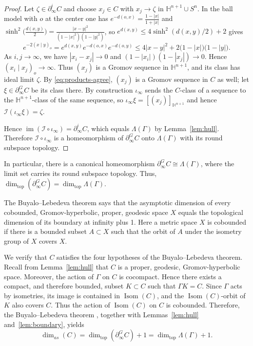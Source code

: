 \documentclass[12pt,oneside,a4paper]{article}
\theoremstyle{mytheorem}
\theoremstyle{remark}
\theoremstyle{definition}
\begin{document}
\begin{proof}
Let \(\zeta\in\partial_\infty^{i}C\) and choose
\(x_j\in C\) with \(x_j\to\zeta\) in \(\mathbb H^{n+1}\cup S^n\).  In the
ball model with \(o\) at the center one has
\(e^{-d(o,x)}=\frac{1-|x|}{1+|x|}\) and
\(\sinh^2\!\bigl(\tfrac{d(x,y)}{2}\bigr)
=\frac{|x-y|^2}{(1-|x|^2)(1-|y|^2)}\), so \(e^{d(x,y)}\leq4\sinh^2(d(x,y)/2)+2\)
gives
\[
 e^{-2(x\mid y)_o}
 =e^{d(x,y)}e^{-d(o,x)}e^{-d(o,y)}
 \leq 4|x-y|^{2}+2\bigl(1-|x|\bigr)\bigl(1-|y|\bigr).
\]
As \(i,j\to\infty\), we have \(|x_i-x_j|\to0\) and
\((1-|x_i|)(1-|x_j|)\to0\). Hence
\((x_i\mid x_j)_o\to\infty\). Thus \((x_j)\) is a Gromov sequence in
\(\mathbb H^{n+1}\), and its class has ideal limit \(\zeta\). By
\eqref{eq:products-agree}, \((x_j)\) is a Gromov sequence in \(C\) as well;
let \(\xi\in\partial_\infty^{G}C\) be its class there.  By construction
\(\iota_\infty\) sends the \(C\)-class of a sequence to the
\(\mathbb H^{n+1}\)-class of the same sequence, so
\(\iota_\infty\xi=[(x_j)]_{\mathbb H^{n+1}}\) and hence
\(\mathcal I(\iota_\infty\xi)=\zeta\).

Hence \(\operatorname{im}(\mathcal I\circ\iota_\infty)
=\partial_\infty^{i}C\), which equals \(\Lambda(\Gamma)\) by
Lemma~\ref{lem:hull}. Therefore \(\mathcal I\circ\iota_\infty\)
is a homeomorphism of \(\partial_\infty^{G}C\) onto \(\Lambda(\Gamma)\)
with its round subspace topology.
\end{proof}

In particular, there is a canonical homeomorphism
$\partial_\infty^{G}C\cong\Lambda(\Gamma)$, where the limit set carries its
round subspace topology. Thus,
$\dim_{\mathrm{top}}(\partial_\infty^{G}C)=\dim_{\mathrm{top}}\Lambda(\Gamma)$.


The Buyalo--Lebedeva theorem \cite[Theorem~6.4]{zbMATH05232578} says that the asymptotic dimension of every cobounded, Gromov-hyperbolic, proper, geodesic space $X$ equals the topological dimension of its boundary at infinity plus 1. Here a metric space $X$ is cobounded if there is a bounded subset $A \subset X$ such that the orbit of $A$ under the isometry group of $X$ covers $X$.

We verify that $C$ satisfies the four hypotheses of the Buyalo--Lebedeva theorem. Recall from Lemma~\ref{lem:hull} that $C$ is a proper, geodesic, Gromov-hyperbolic space. Moreover, the action of $\Gamma$ on $C$ is cocompact. Hence there exists a compact, and therefore bounded, subset $K\subset C$ such that $\Gamma K=C$. Since $\Gamma$ acts by isometries, its image is contained in $\operatorname{Isom}(C)$, and the $\operatorname{Isom}(C)$-orbit of $K$ also covers $C$. Thus the action of $\operatorname{Isom}(C)$ on $C$ is cobounded.
Therefore, the Buyalo--Lebedeva theorem \cite[Theorem~6.4]{zbMATH05232578}, together with Lemmas~\ref{lem:hull} and~\ref{lem:boundary}, yields
\[
\dim_{as}(C)
=
\dim_{\mathrm{top}}(\partial_\infty^{G}C)+1
=
\dim_{\mathrm{top}}\Lambda(\Gamma)+1.
\]
\end{document}
